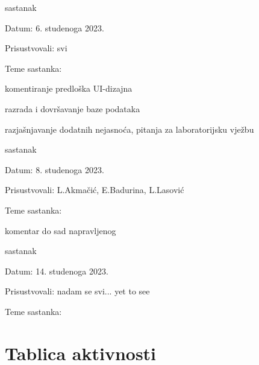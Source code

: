 \begin{packed_enum}
			\item  sastanak
			\item[] \begin{packed_item}
				\item Datum: 6. studenoga 2023.
				\item Prisustvovali: svi
				\item Teme sastanka:
				\begin{packed_item}
					\item  komentiranje predloška UI-dizajna
					\item  razrada i dovršavanje baze podataka
					\item  razjašnjavanje dodatnih nejasnoća, pitanja za laboratorijsku vježbu
				\end{packed_item}
			\end{packed_item}
			
			\item  sastanak			
			\item[] \begin{packed_item}
				\item Datum: 8. studenoga 2023.
				\item Prisustvovali: L.Akmačić, E.Badurina, L.Lasović
				\item Teme sastanka:
				\begin{packed_item}
					\item  komentar do sad napravljenog
				\end{packed_item}
			\end{packed_item}
			
			\item  sastanak			
			\item[] \begin{packed_item}
				\item Datum: 14. studenoga 2023.
				\item Prisustvovali: nadam se svi... yet to see
				\item Teme sastanka:
				\begin{packed_item}
					\item  
				\end{packed_item}
			\end{packed_item}
			
		\end{packed_enum}
		
		\eject
		\section*{Tablica aktivnosti}
		
